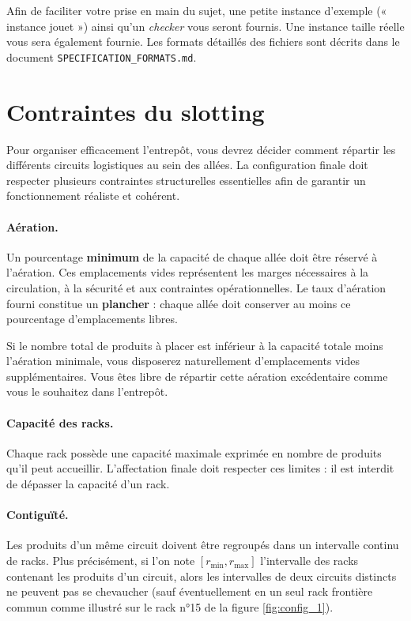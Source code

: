 \documentclass{article}
\begin{document}
\vspace{0.2cm}

Afin de faciliter votre prise en main du sujet, une petite instance d'exemple (« instance jouet ») ainsi qu'un \textit{checker} vous seront fournis.  Une instance taille réelle vous sera également fournie. Les formats détaillés des fichiers sont décrits dans le document \texttt{SPECIFICATION\_FORMATS.md}.


\section{Contraintes du slotting}

Pour organiser efficacement l’entrepôt, vous devrez décider comment répartir les différents circuits logistiques au sein des allées. La configuration finale doit respecter plusieurs contraintes structurelles essentielles afin de garantir un fonctionnement réaliste et cohérent.

\paragraph{Aération.}
Un pourcentage \textbf{minimum} de la capacité de chaque allée doit être réservé à l'aération. Ces emplacements vides représentent les marges nécessaires à la circulation, à la sécurité et aux contraintes opérationnelles. Le taux d'aération fourni constitue un \textbf{plancher} : chaque allée doit conserver au moins ce pourcentage d'emplacements libres.

Si le nombre total de produits à placer est inférieur à la capacité totale moins l'aération minimale, vous disposerez naturellement d'emplacements vides supplémentaires. Vous êtes libre de répartir cette aération excédentaire comme vous le souhaitez dans l'entrepôt.
\paragraph{Capacité des racks.}
Chaque rack possède une capacité maximale exprimée en nombre de produits qu’il peut accueillir.  
L’affectation finale doit respecter ces limites : il est interdit de dépasser la capacité d’un rack.
\paragraph{Contiguïté.}
Les produits d'un même circuit doivent être regroupés dans un intervalle continu de racks.
Plus précisément, si l'on note $[r_{\min}, r_{\max}]$ l'intervalle des racks contenant les produits d'un circuit, alors les intervalles de deux circuits distincts ne peuvent pas se chevaucher (sauf éventuellement en un seul rack frontière commun comme illustré sur le rack n°15 de la figure \ref{fig:config_1}).
\end{document}
